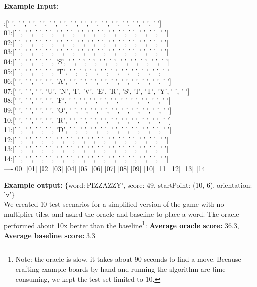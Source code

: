 \documentclass[12pt]{article}
\begin{document}
\textbf{Example Input:}\\
\newenvironment{mono}{\ttfamily}{\par}
\begin{scriptsize}
\begin{mono}
  :[' ', ' ', ' ', ' ', ' ', ' ', ' ', ' ', ' ', ' ', ' ', ' ', ' ', ' ', ' ']\\
01:[' ', ' ', ' ', ' ', ' ', ' ', ' ', ' ', ' ', ' ', ' ', ' ', ' ', ' ', ' ']\\
02:[' ', ' ', ' ', ' ', ' ', ' ', ' ', ' ', ' ', ' ', ' ', ' ', ' ', ' ', ' ']\\
03:[' ', ' ', ' ', ' ', ' ', ' ', ' ', ' ', ' ', ' ', ' ', ' ', ' ', ' ', ' ']\\
04:[' ', ' ', ' ', ' ', 'S', ' ', ' ', ' ', ' ', ' ', ' ', ' ', ' ', ' ', ' ']\\
05:[' ', ' ', ' ', ' ', 'T', ' ', ' ', ' ', ' ', ' ', ' ', ' ', ' ', ' ', ' ']\\
06:[' ', ' ', ' ', ' ', 'A', ' ', ' ', ' ', ' ', ' ', ' ', ' ', ' ', ' ', ' ']\\
07:[' ', ' ', ' ', 'U', 'N', 'I', 'V', 'E', 'R', 'S', 'I', 'T', 'Y', ' ', ' ']\\
08:[' ', ' ', ' ', ' ', 'F', ' ', ' ', ' ', ' ', ' ', ' ', ' ', ' ', ' ', ' ']\\
09:[' ', ' ', ' ', ' ', 'O', ' ', ' ', ' ', ' ', ' ', ' ', ' ', ' ', ' ', ' ']\\
10:[' ', ' ', ' ', ' ', 'R', ' ', ' ', ' ', ' ', ' ', ' ', ' ', ' ', ' ', ' ']\\
11:[' ', ' ', ' ', ' ', 'D', ' ', ' ', ' ', ' ', ' ', ' ', ' ', ' ', ' ', ' ']\\
12:[' ', ' ', ' ', ' ', ' ', ' ', ' ', ' ', ' ', ' ', ' ', ' ', ' ', ' ', ' ']\\
13:[' ', ' ', ' ', ' ', ' ', ' ', ' ', ' ', ' ', ' ', ' ', ' ', ' ', ' ', ' ']\\
14:[' ', ' ', ' ', ' ', ' ', ' ', ' ', ' ', ' ', ' ', ' ', ' ', ' ', ' ', ' ']\\
----|00| |01| |02| |03| |04| |05| |06| |07| |08| |09| |10| |11| |12| |13| |14|
\end{mono}
\end{scriptsize}

\noindent
\textbf{Example output:} $\{$word:'PIZZAZZY', score: 49, startPoint: (10, 6), orientation: 'v'$\}$\\

We created 10 test scenarios for a simplified version of the game with no multiplier tiles, and asked the oracle and baseline to place a word. The oracle performed about 10x better than the baseline\footnote{Note: the oracle is slow, it takes about 90 seconds to find a move. Because crafting example boards by hand and running the algorithm are time consuming, we kept the test set limited to 10.}: \textbf{Average oracle score:} 36.3, \textbf{Average baseline score:} 3.3
\end{document}
